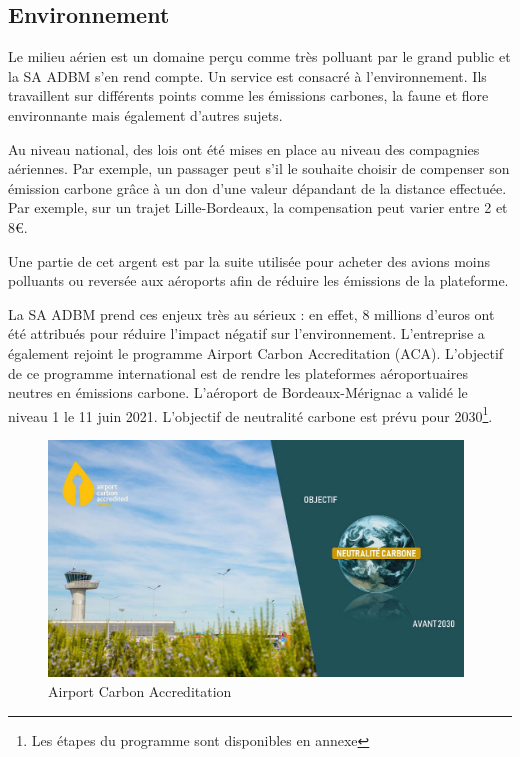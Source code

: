 \subsection{Environnement}

Le milieu aérien est un domaine perçu comme très polluant par le grand public et la SA ADBM s'en rend compte. Un service est consacré à l'environnement. Ils travaillent sur différents points comme les émissions carbones, la faune et flore environnante mais également d'autres sujets.


Au niveau national, des lois ont été mises en place au niveau des compagnies aériennes. Par exemple, un passager peut s'il le souhaite choisir de compenser son émission carbone grâce à un don d'une valeur dépandant de la distance effectuée. Par exemple, sur un trajet Lille-Bordeaux, la compensation peut varier entre 2 et 8€.

Une partie de cet argent est par la suite utilisée pour acheter des avions moins polluants ou reversée aux aéroports afin de réduire les émissions de la plateforme.\newline

La SA ADBM prend ces enjeux très au sérieux : en effet, 8 millions d'euros ont été attribués pour réduire l'impact négatif sur l'environnement.
L'entreprise a également rejoint le programme Airport Carbon Accreditation (ACA). L'objectif de ce programme international est de rendre les plateformes aéroportuaires neutres en émissions carbone.
L'aéroport de Bordeaux-Mérignac a validé le niveau 1 le 11 juin 2021. L'objectif de neutralité carbone est prévu pour 2030\footnote{Les étapes du programme sont disponibles en annexe}.

\begin{figure}[hbt!]
  \centering
  \includegraphics[width=11cm]{Images/aca2030.jpg}
  \caption{Airport Carbon Accreditation}
  \label{fig:aca2030}
\end{figure}


